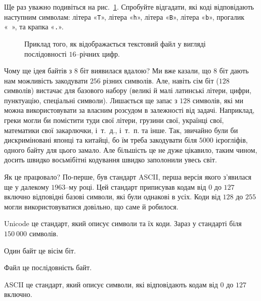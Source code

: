 \documentclass{book}
\newcommand{\bitstr}[1]{{\tt #1}}
\begin{document}
\begin{exercise}
Ще раз уважно подивіться на рис.~\ref{PicHexDump}. Спробуйте відгадати, які коді відповідають наступним символам:
літера «\bitstr{T}»,
літера «\bitstr{h}»,
літера «\bitstr{B}»,
літера «\bitstr{b}»,
прогалик «\bitstr{~}»,
та крапка «\bitstr{.}».
\end{exercise}

\begin{figure}[t]
  \centering
  
  \caption{Приклад того, як відображається текстовий файл у вигляді послідовності $16$--річних цифр.}
  \label{PicHexDump}
\end{figure}

Чому ще ідея байтів з $8$ біт виявилася вдалою?
Ми вже казали, що $8$ біт дають нам можливість закодувати $256$ різних символів.
Але, навіть  сім біт ($128$ символів) вистачає для базового набору (великі й малі латинські літери, цифри, пунктуацію, спеціальні символи).
Лишається ще запас з $128$ символів, які ми можна використовувати за власним розсудом в залежності від задачі.
Наприклад, греки могли би помістити туди свої літери, грузини свої, українці свої, математики свої закарлючки, і~т.~д., і~т.~п. та інше.
Так, звичайно були би дискриміновані японці та китайці, бо їм треба закодувати біля $5000$ ієрогліфів, одного байту для цього замало.
Але більшість це не дуже цікавило, таким чином, досить швидко восьмібітні кодування швидко заполонили увесь світ.

Як це працювало?
По-перше, був стандарт ASCII, перша версія якого з'явилася ще у далекому $1963$--му році.
Цей стандарт приписував кодам від $0$ до $127$ включно відповідні базові символи, які були однакові в усіх.
Коди від $128$ до $255$ могли використовуватися довільно, що саме й робилося.

\begin{summary}
\item Unicode це стандарт, який описує символи та їх коди. Зараз у стандарті біля $150~000$ символів.
\item Один байт це вісім біт.
\item Файл це послідовність байт.
\item ASCII це стандарт, який описує символи, які відповідають кодам від $0$ до $127$ включно.
\end{summary}

\printindex
\end{document}

